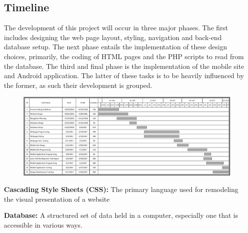 \documentclass[letterpaper,10pt, draftclsnofoot,onecolumn]{IEEEtran}
\begin{document}
{{{{{\subsection{Timeline}{\noindent\color{black}
The development of this project will occur in three major phases. 
The first includes designing the web page layout, styling, navigation and back-end database setup. 
The next phase entails the implementation of these design choices, primarily, the coding of HTML pages and the PHP scripts to read from the database. 
The third and final phase is the implementation of the mobile site and Android application.
The latter of these tasks is to be heavily influenced by the former, as such their development is grouped.
\begin{figure}[H]
\includegraphics[scale=0.5]{GANTTv2.jpeg}
\end{figure}



\noindent\color{black}\textbf{Cascading Style Sheets (CSS):} The primary language used for remodeling the visual presentation of a website

\noindent\color{black}\textbf{Database:} A structured set of data held in a computer, especially one that is accessible in various ways.}

}}}}}
\end{document}
